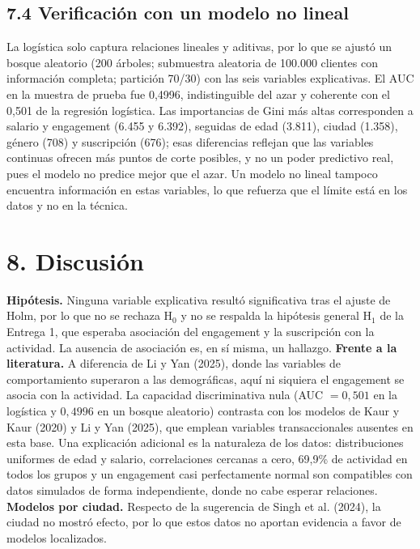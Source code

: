 \documentclass[a4,11pt]{aleph-notas}
\begin{document}
\subsection*{7.4 Verificación con un modelo no lineal}
La logística solo captura relaciones lineales y aditivas, por lo que se ajustó un bosque aleatorio (200 árboles; submuestra aleatoria de 100.000 clientes con información completa; partición 70/30) con las seis variables explicativas. El AUC en la muestra de prueba fue 0,4996, indistinguible del azar y coherente con el 0,501 de la regresión logística. Las importancias de Gini más altas corresponden a salario y engagement (6.455 y 6.392), seguidas de edad (3.811), ciudad (1.358), género (708) y suscripción (676); esas diferencias reflejan que las variables continuas ofrecen más puntos de corte posibles, y no un poder predictivo real, pues el modelo no predice mejor que el azar. Un modelo no lineal tampoco encuentra información en estas variables, lo que refuerza que el límite está en los datos y no en la técnica.

\section*{8. Discusión}
\textbf{Hipótesis.} Ninguna variable explicativa resultó significativa tras el ajuste de Holm, por lo que no se rechaza H$_0$ y no se respalda la hipótesis general H$_1$ de la Entrega 1, que esperaba asociación del engagement y la suscripción con la actividad. La ausencia de asociación es, en sí misma, un hallazgo. \textbf{Frente a la literatura.} A diferencia de Li y Yan (2025), donde las variables de comportamiento superaron a las demográficas, aquí ni siquiera el engagement se asocia con la actividad. La capacidad discriminativa nula (AUC $=0{,}501$ en la logística y $0{,}4996$ en un bosque aleatorio) contrasta con los modelos de Kaur y Kaur (2020) y Li y Yan (2025), que emplean variables transaccionales ausentes en esta base. Una explicación adicional es la naturaleza de los datos: distribuciones uniformes de edad y salario, correlaciones cercanas a cero, 69,9\% de actividad en todos los grupos y un engagement casi perfectamente normal son compatibles con datos simulados de forma independiente, donde no cabe esperar relaciones. \textbf{Modelos por ciudad.} Respecto de la sugerencia de Singh et al. (2024), la ciudad no mostró efecto, por lo que estos datos no aportan evidencia a favor de modelos localizados.
\end{document}

